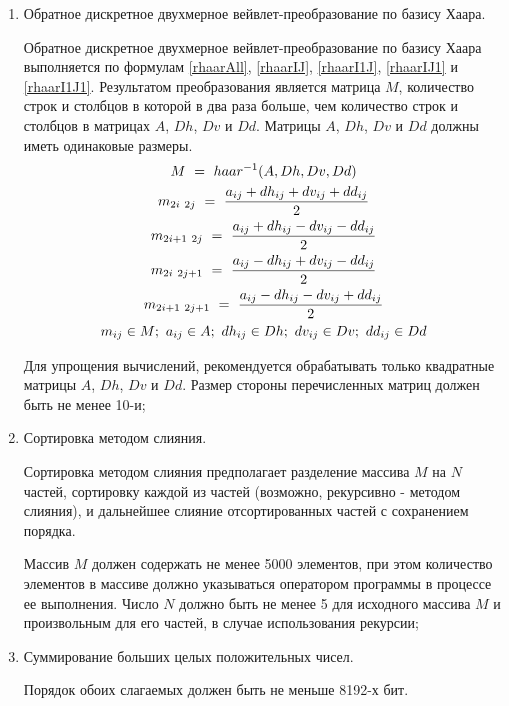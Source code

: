 \begin{enumerate}
	\item Обратное дискретное двухмерное вейвлет-преобразование по базису Хаара.

		Обратное дискретное двухмерное вейвлет-преобразование по базису Хаара выполняется по формулам \eqref{rhaarAll}, \eqref{rhaarIJ}, \eqref{rhaarI1J}, \eqref{rhaarIJ1} и \eqref{rhaarI1J1}. Результатом преобразования является матрица $M$, количество строк и столбцов в которой в два раза больше, чем количество строк и столбцов в матрицах $A$, $Dh$, $Dv$ и $Dd$. Матрицы $A$, $Dh$, $Dv$ и $Dd$ должны иметь одинаковые размеры.
		\begin{gather}
			M ~=~ haar^{-1}(A, Dh, Dv, Dd) \label{rhaarAll} \\
			m_{2i ~ 2j} ~=~ \frac{a_{ij} + dh_{ij} + dv_{ij} + dd_{ij}}{2} \label{rhaarIJ} \\
			m_{2i + 1 ~ 2j} ~=~ \frac{a_{ij} + dh_{ij} - dv_{ij} - dd_{ij}}{2} \label{rhaarI1J} \\
			m_{2i ~ 2j + 1} ~=~ \frac{a_{ij} - dh_{ij} + dv_{ij} - dd_{ij}}{2} \label{rhaarIJ1} \\
			m_{2i + 1 ~ 2j + 1} ~=~ \frac{a_{ij} - dh_{ij} - dv_{ij} + dd_{ij}}{2} \label{rhaarI1J1} \\
			m_{ij} \in M; ~ a_{ij} \in A; ~ dh_{ij} \in Dh; ~ dv_{ij} \in Dv; ~ dd_{ij} \in Dd \notag
		\end{gather}

		Для упрощения вычислений, рекомендуется обрабатывать только квадратные матрицы $A$, $Dh$, $Dv$ и $Dd$. Размер стороны перечисленных матриц должен быть не менее 10-и;

	\item Сортировка методом слияния.

		Сортировка методом слияния предполагает разделение массива $M$ на $N$ частей, сортировку каждой из частей (возможно, рекурсивно - методом слияния), и дальнейшее слияние отсортированных частей с сохранением порядка.

		Массив $M$ должен содержать не менее 5000 элементов, при этом количество элементов в массиве должно указываться оператором программы в процессе ее выполнения. Число $N$ должно быть не менее 5 для исходного массива $M$ и произвольным для его частей, в случае использования рекурсии;

	\item Суммирование больших целых положительных чисел.

		Порядок обоих слагаемых должен быть не меньше 8192-х бит.

\end{enumerate}

